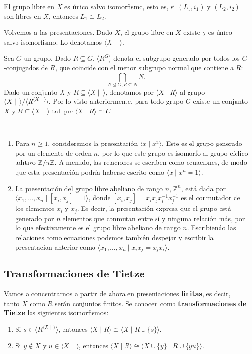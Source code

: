 \documentclass[bibtex, anon]{TEMat-article}
\newcommand{\Z}{\mathbb{Z}}
\providecommand{\gene}[1]{\langle{#1}\rangle}
\begin{document}
\begin{ejemplo}
	El grupo libre en $X$ es único salvo isomorfismo, esto es, si $(L_1,i_1)$ y $(L_2,i_2)$ son libres en $X$, entonces $L_1\cong L_2$.
	\end{ejemplo}

Volvemos a las presentaciones. Dado $X$, el grupo libre en $X$ existe y es único salvo isomorfismo. Lo denotamos $\gene{X\mid\ }$. 

Sea $G$ un grupo. Dado $R\subseteq G$, $\gene{R^G}$ denota el subgrupo generado por todos los $G$-conjugados de $R$, que coincide con el menor subgrupo normal que contiene a $R$: $$\bigcap_{N\trianglelefteq G, R\subseteq N} N.$$
Dado un conjunto $X$ y $R\subseteq\gene{X\mid\ }$, denotamos por $\gene{X\mid R}$ al grupo $\gene{X\mid\ }/\gene{R^{\gene{X\mid\ }}}$. Por lo visto anteriormente, para todo grupo $G$ existe un conjunto $X$ y $R\subseteq\gene{X\mid\ }$ tal que $\gene{X\mid R}\cong G$.

\begin{ejemplo}\
	\begin{enumerate}[label=\roman*]
		\item Para $n\geq 1$, consideremos la presentación $\gene{x\mid x^n}$. Este es el grupo generado por un elemento de orden $n$, por lo que este grupo es isomorfo al grupo cíclico aditivo $\Z/n\Z$. A menudo, las relaciones se escriben como ecuaciones, de modo que esta presentación podría haberse escrito como $\gene{x\mid x^n=1}$. 
	\item  La presentación del grupo libre abeliano de rango $n$, $\Z^n$, está dada por $\gene{x_1,\dots, x_n\mid [x_i,x_j]=1}$, donde $[x_i,x_j]=x_ix_jx_i^{-1}x_j^{-1}$ es el conmutador de los elementos $x_i$ y $x_j$. Es decir, la presentación expresa que el grupo está generado por $n$ elementos que conmutan entre sí y ninguna relación más, por lo que efectivamente es el grupo libre abeliano de rango $n$. Escribiendo las relaciones como ecuaciones podemos también despejar y escribir la presentación anterior como $\gene{x_1,\dots, x_n\mid x_ix_j=x_jx_i}$. 
	\end{enumerate}
	\end{ejemplo}

\subsection{Transformaciones de Tietze}

Vamos a concentrarnos a partir de ahora en presentaciones \textbf{finitas}, es decir, tanto $X$ como $R$ serán conjuntos finitos. Se conocen como \textbf{transformaciones de Tietze} los siguientes isomorfismos:
\begin{enumerate}
	\item Si $s\in \gene{R^{\gene{X\mid\ }}}$, entonces $\gene{X\mid R}\cong\gene{X\mid R\cup\{s\}}$.
	\item Si $y\notin X$ y $u\in\gene{X\mid\ }$, entonces $\gene{X\mid R}\cong \gene{X\cup \{y\}\mid R\cup \{yu\}}$.
\end{enumerate}
\end{document}
